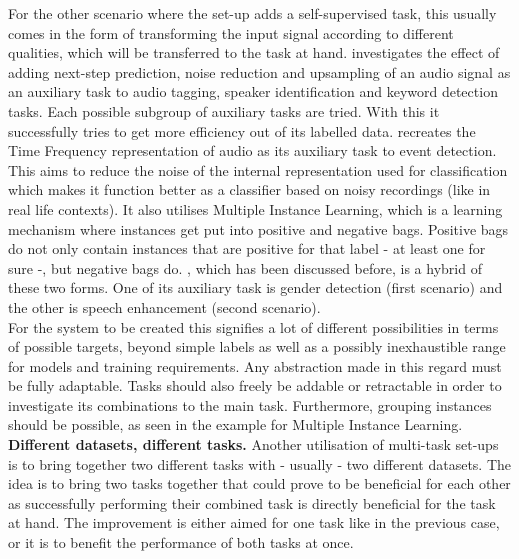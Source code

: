 For the other scenario where the set-up adds a self-supervised task, this usually comes in the form of transforming the input signal according to different qualities, which will be transferred to the task at hand. \cite{lee2019label} investigates the effect of adding next-step prediction, noise reduction and upsampling of an audio signal as an auxiliary task to audio tagging, speaker identification and keyword detection tasks. Each possible subgroup of auxiliary tasks are tried.  With this it successfully tries to get more efficiency out of its labelled data. \cite{deshmukh2020multi} recreates the Time Frequency representation of audio as its auxiliary task to event detection. This aims to reduce the noise of the internal representation used for classification which makes it function better as a classifier based on noisy recordings (like in real life contexts). It also utilises Multiple Instance Learning, which is a learning mechanism where instances get put into positive and negative bags.  Positive bags do not only contain instances that are positive for that label - at least one for sure -, but negative bags do. \cite{lu2004multitask}, which has been discussed before, is a hybrid of these two forms. One of its auxiliary task is gender detection (first scenario) and the other is speech enhancement (second scenario). \\

For the system to be created this signifies a lot of different possibilities in terms of possible targets, beyond simple labels as well as a possibly inexhaustible range for models and training requirements. Any abstraction made in this regard must be fully adaptable. Tasks should also freely be addable or retractable in order to investigate its combinations to the main task. Furthermore, grouping instances should be possible, as seen in the example for Multiple Instance Learning. \\


\textbf{Different datasets, different tasks.} Another utilisation of multi-task set-ups is to bring together two different tasks with - usually - two different datasets. The idea is to bring two tasks together that could prove to be beneficial for each other as successfully performing their combined task is directly beneficial for the task at hand. The improvement is either aimed for one task like in the previous case, or it is to benefit the performance of both tasks at once. \\

